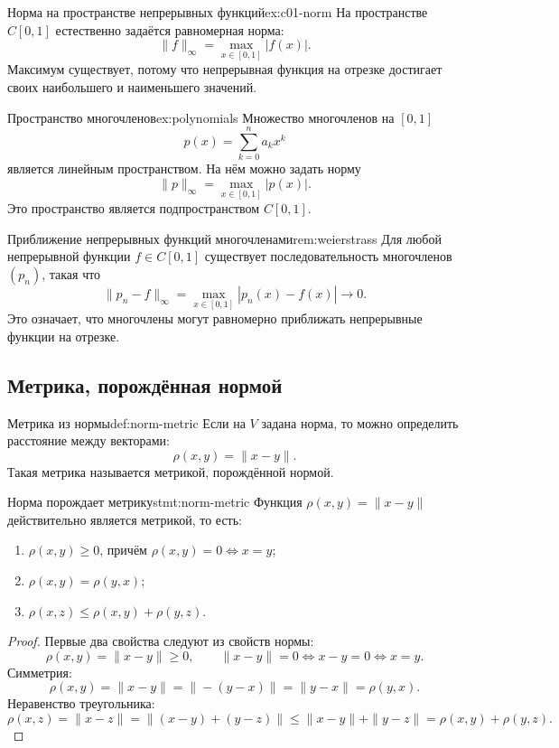 \begin{Example}{Норма на пространстве непрерывных функций}{ex:c01-norm}
	На пространстве \(C[0,1]\) естественно задаётся равномерная норма:
	\[
	\|f\|_{\infty}
	=
	\max_{x\in[0,1]}|f(x)|.
	\]
	Максимум существует, потому что непрерывная функция на отрезке достигает своих наибольшего и наименьшего значений.
\end{Example}

\begin{Example}{Пространство многочленов}{ex:polynomials}
	Множество многочленов на \([0,1]\)
	\[
	p(x)=\sum_{k=0}^{n}a_kx^k
	\]
	является линейным пространством. На нём можно задать норму
	\[
	\|p\|_{\infty}
	=
	\max_{x\in[0,1]}|p(x)|.
	\]
	Это пространство является подпространством \(C[0,1]\).
\end{Example}

\begin{Remark}{Приближение непрерывных функций многочленами}{rem:weierstrass}
	Для любой непрерывной функции \(f\in C[0,1]\) существует последовательность многочленов \((p_n)\), такая что
	\[
	\|p_n-f\|_{\infty}
	=
	\max_{x\in[0,1]}|p_n(x)-f(x)|
	\to 0.
	\]
	Это означает, что многочлены могут равномерно приближать непрерывные функции на отрезке.
\end{Remark}

\subsection{Метрика, порождённая нормой}

\begin{Definition}{Метрика из нормы}{def:norm-metric}
	Если на \(V\) задана норма, то можно определить расстояние между векторами:
	\[
	\rho(x,y)=\|x-y\|.
	\]
	Такая метрика называется метрикой, порождённой нормой.
\end{Definition}

\begin{Statement}{Норма порождает метрику}{stmt:norm-metric}
	Функция \(\rho(x,y)=\|x-y\|\) действительно является метрикой, то есть:
	\begin{enumerate}
		\item \(\rho(x,y)\ge 0\), причём \(\rho(x,y)=0\iff x=y\);
		\item \(\rho(x,y)=\rho(y,x)\);
		\item \(\rho(x,z)\le \rho(x,y)+\rho(y,z)\).
	\end{enumerate}
\end{Statement}

\begin{proof}
	Первые два свойства следуют из свойств нормы:
	\[
	\rho(x,y)=\|x-y\|\ge 0,
	\qquad
	\|x-y\|=0\iff x-y=0\iff x=y.
	\]
	Симметрия:
	\[
	\rho(x,y)=\|x-y\|=\|-(y-x)\|=\|y-x\|=\rho(y,x).
	\]
	Неравенство треугольника:
	\[
	\rho(x,z)=\|x-z\|
	=
	\|(x-y)+(y-z)\|
	\le
	\|x-y\|+\|y-z\|
	=
	\rho(x,y)+\rho(y,z).
	\]
\end{proof}

